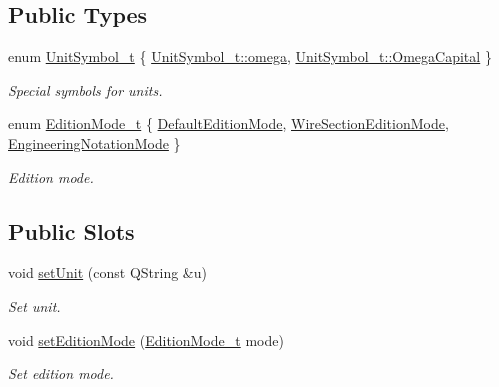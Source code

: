 \subsection*{Public Types}
\begin{DoxyCompactItemize}
\item 
enum \hyperlink{classmdt_double_edit_a29d81fa03124e501a6162b5ea018cdb8}{Unit\-Symbol\-\_\-t} \{ \hyperlink{classmdt_double_edit_a29d81fa03124e501a6162b5ea018cdb8ac6d6bd7ebf806f43c76acc3681703b81}{Unit\-Symbol\-\_\-t\-::omega}, 
\hyperlink{classmdt_double_edit_a29d81fa03124e501a6162b5ea018cdb8aba196d25e527b3d00f4af5bc7a013572}{Unit\-Symbol\-\_\-t\-::\-Omega\-Capital}
 \}
\begin{DoxyCompactList}\small\item\em Special symbols for units. \end{DoxyCompactList}\item 
enum \hyperlink{classmdt_double_edit_a52cc3f5b9d6acd6838c52d478b3ea4dd}{Edition\-Mode\-\_\-t} \{ \hyperlink{classmdt_double_edit_a52cc3f5b9d6acd6838c52d478b3ea4dda4910df3bf542ccbaadc53e42150a0e00}{Default\-Edition\-Mode}, 
\hyperlink{classmdt_double_edit_a52cc3f5b9d6acd6838c52d478b3ea4dda9c90f1e9bef448e3a67b94ef8e3245e7}{Wire\-Section\-Edition\-Mode}, 
\hyperlink{classmdt_double_edit_a52cc3f5b9d6acd6838c52d478b3ea4dda753af1552a3c99afd1c1c826b4897bb7}{Engineering\-Notation\-Mode}
 \}
\begin{DoxyCompactList}\small\item\em Edition mode. \end{DoxyCompactList}\end{DoxyCompactItemize}
\subsection*{Public Slots}
\begin{DoxyCompactItemize}
\item 
void \hyperlink{classmdt_double_edit_a3eb1b0434235fae23fa3f795fb90066e}{set\-Unit} (const Q\-String \&u)
\begin{DoxyCompactList}\small\item\em Set unit. \end{DoxyCompactList}\item 
void \hyperlink{classmdt_double_edit_aca9eebfc6e8a57be1b0c7f3a7b1a1e45}{set\-Edition\-Mode} (\hyperlink{classmdt_double_edit_a52cc3f5b9d6acd6838c52d478b3ea4dd}{Edition\-Mode\-\_\-t} mode)
\begin{DoxyCompactList}\small\item\em Set edition mode. \end{DoxyCompactList}\end{DoxyCompactItemize}
